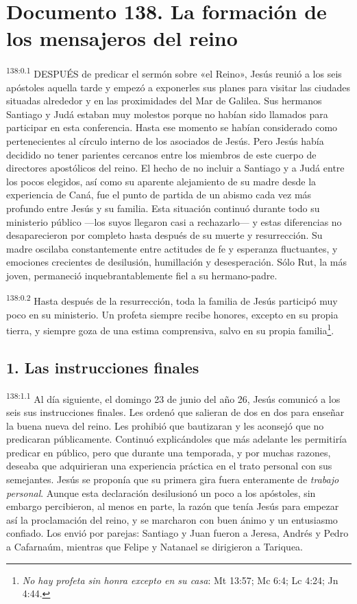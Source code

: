 \chapter{Documento 138. La formación de los mensajeros del reino}
\par 
\textsuperscript{138:0.1} DESPUÉS de predicar el sermón sobre «el Reino», Jesús reunió a los seis apóstoles aquella tarde y empezó a exponerles sus planes para visitar las ciudades situadas alrededor y en las proximidades del Mar de Galilea. Sus hermanos Santiago y Judá estaban muy molestos porque no habían sido llamados para participar en esta conferencia. Hasta ese momento se habían considerado como pertenecientes al círculo interno de los asociados de Jesús. Pero Jesús había decidido no tener parientes cercanos entre los miembros de este cuerpo de directores apostólicos del reino. El hecho de no incluir a Santiago y a Judá entre los pocos elegidos, así como su aparente alejamiento de su madre desde la experiencia de Caná, fue el punto de partida de un abismo cada vez más profundo entre Jesús y su familia. Esta situación continuó durante todo su ministerio público ---los suyos llegaron casi a rechazarlo--- y estas diferencias no desaparecieron por completo hasta después de su muerte y resurrección. Su madre oscilaba constantemente entre actitudes de fe y esperanza fluctuantes, y emociones crecientes de desilusión, humillación y desesperación. Sólo Rut, la más joven, permaneció inquebrantablemente fiel a su hermano-padre.

\par 
\textsuperscript{138:0.2} Hasta después de la resurrección, toda la familia de Jesús participó muy poco en su ministerio. Un profeta siempre recibe honores, excepto en su propia tierra, y siempre goza de una estima comprensiva, salvo en su propia familia\footnote{\textit{No hay profeta sin honra excepto en su casa}: Mt 13:57; Mc 6:4; Lc 4:24; Jn 4:44.}.

\section*{1. Las instrucciones finales}
\par 
\textsuperscript{138:1.1} Al día siguiente, el domingo 23 de junio del año 26, Jesús comunicó a los seis sus instrucciones finales. Les ordenó que salieran de dos en dos para enseñar la buena nueva del reino. Les prohibió que bautizaran y les aconsejó que no predicaran públicamente. Continuó explicándoles que más adelante les permitiría predicar en público, pero que durante una temporada, y por muchas razones, deseaba que adquirieran una experiencia práctica en el trato personal con sus semejantes. Jesús se proponía que su primera gira fuera enteramente de \textit{trabajo personal}. Aunque esta declaración desilusionó un poco a los apóstoles, sin embargo percibieron, al menos en parte, la razón que tenía Jesús para empezar así la proclamación del reino, y se marcharon con buen ánimo y un entusiasmo confiado. Los envió por parejas: Santiago y Juan fueron a Jeresa, Andrés y Pedro a Cafarnaúm, mientras que Felipe y Natanael se dirigieron a Tariquea.

